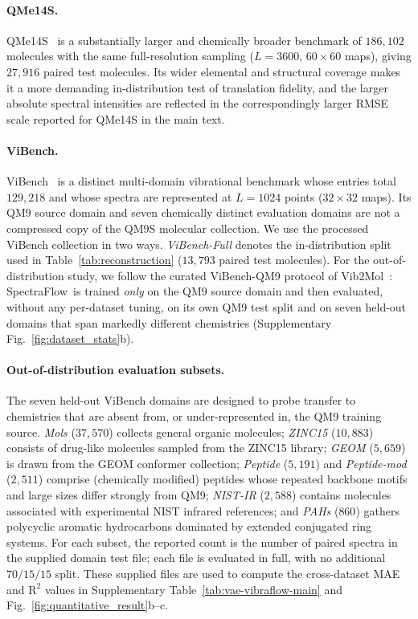 \documentclass[pdflatex,sn-mathphys-num]{sn-jnl}%
\newcommand{\mname}{SpectraFlow}
\theoremstyle{thmstyleone}%
\theoremstyle{thmstyletwo}%
\theoremstyle{thmstylethree}%
\begin{document}
\begin{appendices}
\paragraph{QMe14S.} QMe14S~\citep{yuan2025qme14s} is a substantially larger and chemically broader benchmark of $186{,}102$ molecules with the same full-resolution sampling ($L{=}3600$, $60\times60$ maps), giving $27{,}916$ paired test molecules. Its wider elemental and structural coverage makes it a more demanding in-distribution test of translation fidelity, and the larger absolute spectral intensities are reflected in the correspondingly larger RMSE scale reported for QMe14S in the main text.

\paragraph{ViBench.} ViBench~\citep{lu2025vib2mol} is a distinct multi-domain vibrational benchmark whose entries total $129{,}218$ and whose spectra are represented at $L{=}1024$ points ($32\times32$ maps). Its QM9 source domain and seven chemically distinct evaluation domains are not a compressed copy of the QM9S molecular collection. We use the processed ViBench collection in two ways. \emph{ViBench-Full} denotes the in-distribution split used in Table~\ref{tab:reconstruction} ($13{,}793$ paired test molecules). For the out-of-distribution study, we follow the curated ViBench-QM9 protocol of Vib2Mol~\citep{lu2025vib2mol}: \mname\ is trained \emph{only} on the QM9 source domain and then evaluated, without any per-dataset tuning, on its own QM9 test split and on seven held-out domains that span markedly different chemistries (Supplementary Fig.~\ref{fig:dataset_stats}b).

\paragraph{Out-of-distribution evaluation subsets.} The seven held-out ViBench domains are designed to probe transfer to chemistries that are absent from, or under-represented in, the QM9 training source. \emph{Mols} ($37{,}570$) collects general organic molecules; \emph{ZINC15} ($10{,}883$) consists of drug-like molecules sampled from the ZINC15 library; \emph{GEOM} ($5{,}659$) is drawn from the GEOM conformer collection; \emph{Peptide} ($5{,}191$) and \emph{Peptide-mod} ($2{,}511$) comprise (chemically modified) peptides whose repeated backbone motifs and large sizes differ strongly from QM9; \emph{NIST-IR} ($2{,}588$) contains molecules associated with experimental NIST infrared references; and \emph{PAHs} ($860$) gathers polycyclic aromatic hydrocarbons dominated by extended conjugated ring systems. For each subset, the reported count is the number of paired spectra in the supplied domain test file; each file is evaluated in full, with no additional $70/15/15$ split. These supplied files are used to compute the cross-dataset MAE and $\text{R}^2$ values in Supplementary Table~\ref{tab:vae-vibraflow-main} and Fig.~\ref{fig:quantitative_result}b--c.


\end{appendices}
\end{document}
